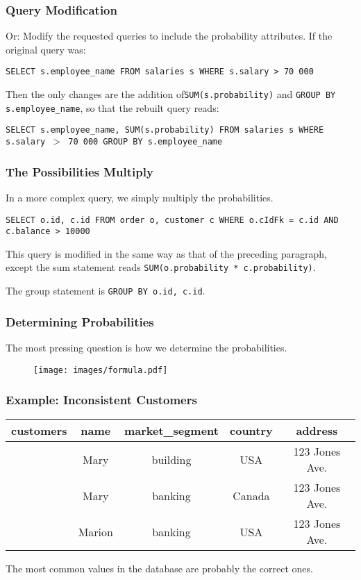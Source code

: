 \begin{frame}
\frametitle{Query Modification}

Or: Modify the requested queries to include the probability attributes. If the original query was:

\texttt{SELECT s.employee\_name FROM salaries s WHERE s.salary > 70~000}


Then the only changes are the addition of\texttt{SUM(s.probability)} and \texttt{GROUP BY s.employee\_name}, so that the rebuilt query reads:


\texttt{SELECT s.employee\_name, SUM(s.probability) FROM salaries s WHERE s.salary $>$ 70~000 GROUP BY s.employee\_name}


\end{frame}


\begin{frame}
\frametitle{The Possibilities Multiply}

In a more complex query, we simply multiply the probabilities. 

\texttt{SELECT o.id, c.id FROM order o, customer c  WHERE o.cIdFk = c.id AND c.balance > 10000 }


This query is modified in the same way as that of the preceding paragraph, except the sum statement reads \texttt{SUM(o.probability * c.probability)}.

The group statement is \texttt{GROUP BY o.id, c.id}.


\end{frame}


\begin{frame}
\frametitle{Determining Probabilities}

The most pressing question is how we determine the probabilities. 

\begin{figure}[!h]
  \centering \texttt{[image: images/formula.pdf]}
\end{figure}

\end{frame}


\begin{frame}
\frametitle{Example: Inconsistent Customers}

\begin{table}[h]\begin{center}
        \begin{tabular}{r | c  c  c  c } 
					customers & name & market\_segment & country & address\\ \hline
	           		 & Mary   & building & USA    & 123 Jones Ave. \\ 
	         		 & Mary   & banking  & Canada & 123 Jones Ave. \\ 
					 & Marion & banking  & USA    & 123 Jones Ave. \\ 
        \end{tabular}
        
\end{center}\end{table}

The most common values in the database are probably the correct ones.

\end{frame}


